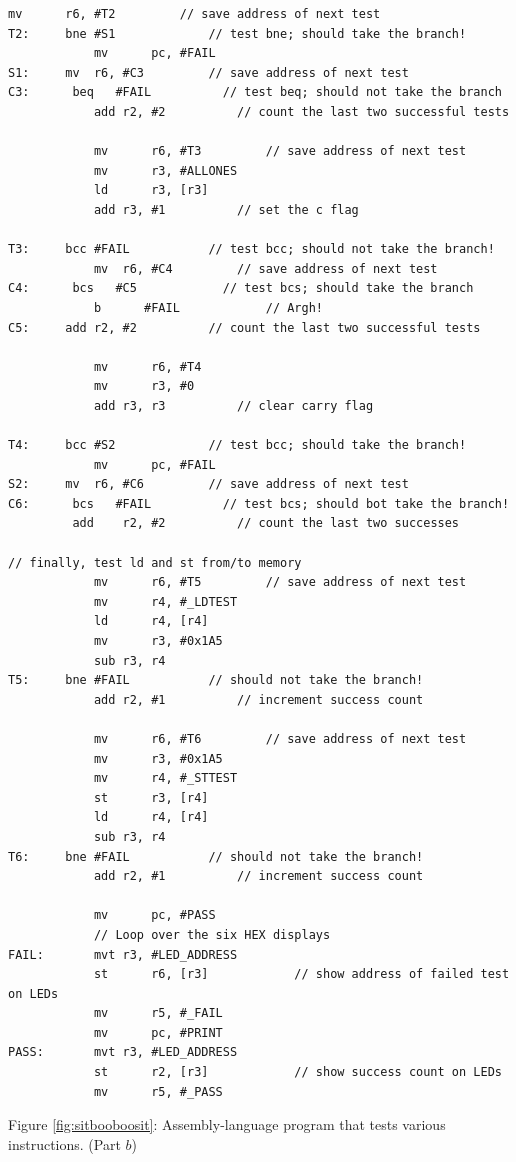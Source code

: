\documentclass[epsfig,10pt,fullpage]{article}
\begin{document}
\begin{center}
\begin{minipage}[t]{14 cm}
\begin{lstlisting}[name=proc]
			mv		r6, #T2			// save address of next test
T2:		bne	#S1    			// test bne; should take the branch!
			mv		pc, #FAIL
S1:		mv 	r6, #C3			// save address of next test
C3:      beq   #FAIL          // test beq; should not take the branch
			add	r2, #2			// count the last two successful tests

			mv		r6, #T3			// save address of next test
			mv		r3, #ALLONES
			ld		r3, [r3]
			add	r3, #1			// set the c flag

T3:		bcc	#FAIL    		// test bcc; should not take the branch!
			mv 	r6, #C4			// save address of next test
C4:      bcs   #C5            // test bcs; should take the branch
    		b	   #FAIL    		// Argh!
C5:		add	r2, #2			// count the last two successful tests

			mv		r6, #T4
			mv		r3, #0
			add	r3, r3			// clear carry flag

T4:		bcc	#S2   			// test bcc; should take the branch!
			mv		pc, #FAIL
S2:		mv 	r6, #C6			// save address of next test
C6:      bcs   #FAIL          // test bcs; should bot take the branch!
         add	r2, #2			// count the last two successes

// finally, test ld and st from/to memory
			mv		r6, #T5			// save address of next test
			mv		r4, #_LDTEST
			ld		r4, [r4]
			mv		r3, #0x1A5
			sub	r3, r4
T5:		bne	#FAIL	      	// should not take the branch!
			add	r2, #1			// increment success count

			mv		r6, #T6			// save address of next test
			mv		r3, #0x1A5
			mv		r4, #_STTEST
			st		r3, [r4]		
			ld		r4, [r4]
			sub	r3, r4
T6:		bne	#FAIL    		// should not take the branch!
			add	r2, #1			// increment success count

			mv		pc, #PASS
			// Loop over the six HEX displays
FAIL:		mvt	r3, #LED_ADDRESS
			st		r6, [r3]			// show address of failed test on LEDs
			mv		r5, #_FAIL
			mv		pc, #PRINT
PASS:		mvt	r3, #LED_ADDRESS
			st		r2, [r3]			// show success count on LEDs
			mv		r5, #_PASS
\end{lstlisting}
\end{minipage}
\end{center}

\begin{center}
Figure \ref{fig:sitbooboosit}: Assembly-language program that tests various instructions. (Part $b$)
\end{center}
\end{document}
